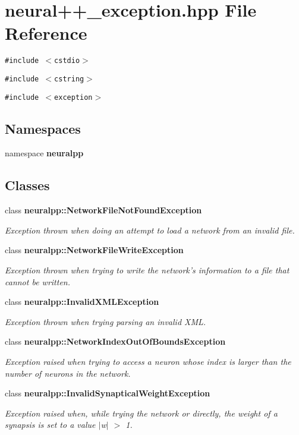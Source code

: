 \section{neural++\_\-exception.hpp File Reference}
\label{neural_09_09__exception_8hpp}
{\tt \#include $<$cstdio$>$}\par
{\tt \#include $<$cstring$>$}\par
{\tt \#include $<$exception$>$}\par
\subsection*{Namespaces}
\begin{CompactItemize}
\item 
namespace {\bf neuralpp}
\end{CompactItemize}
\subsection*{Classes}
\begin{CompactItemize}
\item 
class {\bf neuralpp::NetworkFileNotFoundException}
\begin{CompactList}\small\item\em Exception thrown when doing an attempt to load a network from an invalid file. \item\end{CompactList}\item 
class {\bf neuralpp::NetworkFileWriteException}
\begin{CompactList}\small\item\em Exception thrown when trying to write the network's information to a file that cannot be written. \item\end{CompactList}\item 
class {\bf neuralpp::InvalidXMLException}
\begin{CompactList}\small\item\em Exception thrown when trying parsing an invalid XML. \item\end{CompactList}\item 
class {\bf neuralpp::NetworkIndexOutOfBoundsException}
\begin{CompactList}\small\item\em Exception raised when trying to access a neuron whose index is larger than the number of neurons in the network. \item\end{CompactList}\item 
class {\bf neuralpp::InvalidSynapticalWeightException}
\begin{CompactList}\small\item\em Exception raised when, while trying the network or directly, the weight of a synapsis is set to a value $|$w$|$ $>$ 1. \item\end{CompactList}\end{CompactItemize}
